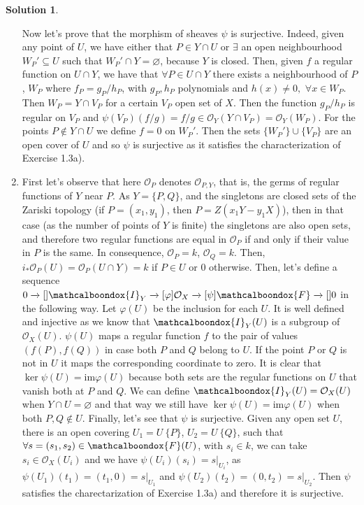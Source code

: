 \documentclass[12pt]{article}
\newcommand{\ima}{\ensuremath{\mathrm{im}}}
\newcommand{\locO}{\ensuremath{\mathcal{O}}}
\theoremstyle{definition}
\newtheorem*{sol}{Solution}
\newcommand{\sF}{\ensuremath{\mathcalboondox{F}}}
\newcommand{\sI}{\ensuremath{\mathcalboondox{I}}}
\begin{document}
\begin{sol}
\begin{enumerate}[label = \alph*)]
		Now let's prove that the morphism of sheaves $\psi$ is surjective. Indeed, given any point of $U$, we have either that $P \in Y \cap U$ or $\exists$ an open neighbourhood $W_P' \subseteq U$ such that $W_P' \cap Y = \varnothing$, because $Y$ is closed. Then, given $f$ a regular function on $U \cap Y$, we have that $\forall P \in U \cap Y$ there exists a neighbourhood of $P$, $W_P$ where $f_P = g_P/h_P$, with $g_P,h_P$ polynomials and $h(x) \neq 0, \, \, \forall x \in W_P$. Then $W_P = Y \cap V_P$ for a certain $V_P$ open set of $X$. Then the function $g_P/h_P$ is regular on $V_P$ and $\psi(V_P)(f/g) = f/g \in \locO_Y(Y \cap V_P) = \locO_Y(W_P)$. For the points $P \notin Y \cap U$ we define $f = 0$ on $W_P'$. Then the sets $\{W_P'\} \cup \{V_P\}$ are an open cover of $U$ and so $\psi$ is surjective as it satisfies the characterization of Exercise 1.3a).

		\item First let's observe that here $\locO_P$ denotes $\locO_{P,Y}$, that is, the germs of regular functions of $Y$ near $P$. As $Y = \{P,Q\}$, and the singletons are closed sets of the Zariski topology (if $P = (x_1,y_1)$, then $P = Z(x_1Y-y_1X)$), then in that case (as the number of points of $Y$ is finite) the singletons are also open sets, and therefore two regular functions are equal in $\locO_P$ if and only if their value in $P$ is the same. In consequence, $\locO_P = k$, $\locO_Q = k$. Then, $i_*\locO_P(U) = \locO_P(U \cap Y) = k$ if $P \in U$ or 0 otherwise. Then, let's define a sequence $0 \xrightarrow{}[] \sI_Y \xrightarrow{}[\varphi] \locO_X \xrightarrow{}[\psi] \sF \xrightarrow{}[] 0$ in the following way.
		Let $\varphi(U)$ be the inclusion for each $U$. It is well defined and injective as we know that $\sI_Y(U)$ is a subgroup of $\locO_X(U)$. $\psi(U)$ maps a regular function $f$ to the pair of values $(f(P),f(Q))$ in case both $P$ and $Q$ belong to $U$. If the point $P$ or $Q$ is not in $U$ it maps the corresponding coordinate to zero. It is clear that $\ker \psi(U) = \ima \varphi(U)$ because both sets are the regular functions on $U$ that vanish both at $P$ and $Q$. We can define $\sI_Y(U) = \locO_X(U)$ when $Y \cap U = \varnothing$ and that way we still have $\ker \psi(U) = \ima \varphi(U)$ when both $P,Q \notin U$. Finally, let's see that $\psi$ is surjective. Given any open set $U$, there is an open covering $U_1 = U \ \{P\}$, $U_2 = U \ \{Q\}$, such that $\forall s = (s_1, s_2) \in \sF(U)$, with $s_i \in k$, we can take $s_i \in \locO_X(U_i)$ and we have $\psi(U_i)(s_i) = s|_{U_i}$, as $\psi(U_1)(t_1) = (t_1,0) = s|_{U_1}$ and $\psi(U_2)(t_2) = (0,t_2) = s|_{U_2}$. Then $\psi$ satisfies the charectarization of Exercise 1.3a) and therefore it is surjective.


\end{enumerate}
\end{sol}
\end{document}
